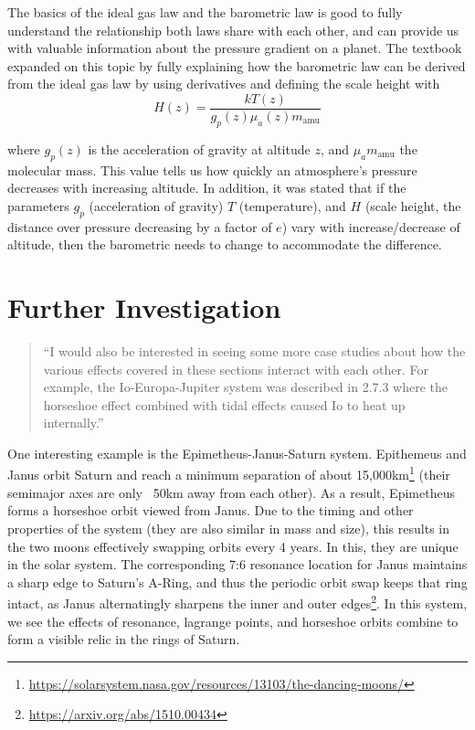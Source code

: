\documentclass[11pt]{article}
\begin{document}
The basics of the ideal gas law and the barometric law is good to fully understand the relationship both laws share with each other, and can provide us with valuable information about the pressure gradient on a planet. The textbook expanded on this topic by fully explaining how the barometric law can be derived from the ideal gas law by using derivatives and defining the scale height with
\begin{equation}
   H(z) = \frac{kT(z)}{g_p(z)\mu_a(z)m_{\text{amu}}}
\end{equation}

where $g_p(z)$ is the acceleration of gravity at altitude $z$, and $\mu_am_{\text{amu}}$ the molecular mass. This value tells us how quickly an atmosphere's pressure decreases with increasing altitude. In addition, it was stated that if the parameters $g_p$ (acceleration of gravity) $T$ (temperature), and $H$ (scale height, the distance over pressure decreasing by a factor of $e$) vary with increase/decrease of altitude, then the barometric needs to change to accommodate the difference.

	\newpage
	\section{Further Investigation}
\begin{quote}
    “I would also be interested in seeing some more case studies about how the various effects covered in these sections interact with each other. For example, the Io-Europa-Jupiter system was described in 2.7.3 where the horseshoe effect combined with tidal effects caused Io to heat up internally.”
\end{quote}

One interesting example is the Epimetheus-Janus-Saturn system. Epithemeus and Janus orbit Saturn and reach a minimum separation of about 15,000km\footnote{\url{https://solarsystem.nasa.gov/resources/13103/the-dancing-moons/}} (their semimajor axes are only ~50km away from each other). As a result, Epimetheus forms a horseshoe orbit viewed from Janus. Due to the timing and other properties of the system (they are also similar in mass and size), this results in the two moons effectively swapping orbits every 4 years. In this, they are unique in the solar system. The corresponding 7:6 resonance location for Janus maintains a sharp edge to Saturn’s A-Ring, and thus the periodic orbit swap keeps that ring intact, as Janus alternatingly sharpens the inner and outer edges\footnote{\url{https://arxiv.org/abs/1510.00434}}. In this system, we see the effects of resonance, lagrange points, and horseshoe orbits combine to form a visible relic in the rings of Saturn.
\end{document}
